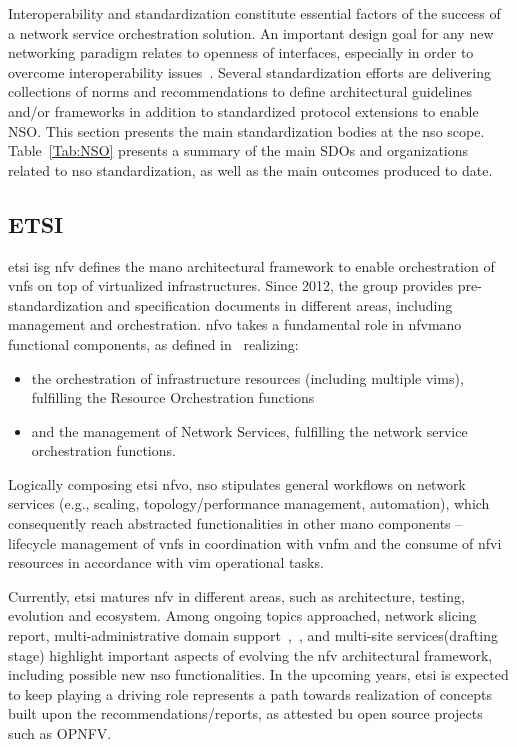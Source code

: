 Interoperability and standardization constitute essential factors of the success of a network service orchestration solution. An important design goal for any new networking paradigm relates to openness of interfaces, especially in order to overcome interoperability issues~\cite{Rotsos2017NetworkSurvey}. 
Several standardization efforts are delivering collections of norms and recommendations to define  architectural guidelines and/or frameworks in addition to standardized protocol extensions to enable NSO. This section presents the main standardization bodies at the \gls{nso} scope. Table~\ref{Tab:NSO} presents a summary of the main SDOs and organizations related to \gls{nso} standardization, as well as the main outcomes produced to date.

\subsection{ETSI}

\gls{etsi} \gls{isg} \gls{nfv} defines the \gls{mano} architectural framework to enable orchestration of \glspl{vnf} on top of virtualized infrastructures. Since 2012, the group provides pre-standardization and specification documents in different areas, including management and orchestration. \gls{nfvo} takes a fundamental role in \gls{nfvmano} functional components, as defined in~\cite{GSNFV-MAN001:2014} realizing:
\begin{itemize}
\item the orchestration of infrastructure resources (including multiple \glspl{vim}), fulfilling the Resource Orchestration functions 
\item and the management of Network Services, fulfilling the network service orchestration functions.
\end{itemize}

Logically composing \gls{etsi} \gls{nfvo}, \gls{nso} stipulates general workflows on network services (e.g., scaling, topology/performance management, automation), which consequently reach abstracted functionalities in other \gls{mano} components -- lifecycle management of \glspl{vnf} in coordination with \gls{vnfm} and the consume of \gls{nfvi} resources in accordance with \gls{vim} operational tasks.

Currently, \gls{etsi} matures \gls{nfv} in different areas, such as architecture, testing, evolution and ecosystem. Among ongoing topics approached, network slicing report, multi-administrative domain support~\cite{ETSIIndustrySpecificationGroupISGNFV2014NetworkOptions},~\cite{ETSIGRDomains}, and multi-site services(drafting stage) highlight important aspects of evolving the \gls{nfv} architectural framework, including possible new \gls{nso} functionalities. 
In the upcoming years, \gls{etsi} is expected to keep playing a driving role represents a path towards realization of concepts built upon the recommendations/reports, as attested bu open source projects such as OPNFV.

